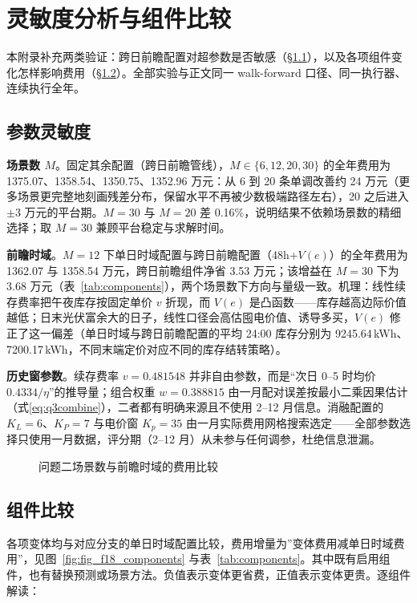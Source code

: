 \section{灵敏度分析与组件比较}\label{sec:sensitivity}
本附录补充两类验证：跨日前瞻配置对超参数是否敏感（\S\ref{sec:sens-param}），以及各项组件变化怎样影响费用（\S\ref{sec:ablation}）。全部实验与正文同一 walk-forward 口径、同一执行器、连续执行全年。

\subsection{参数灵敏度}\label{sec:sens-param}
\textbf{场景数 $M$}。固定其余配置（跨日前瞻管线），$M\in\{6,12,20,30\}$ 的全年费用为 1375.07、1358.54、1350.75、1352.96 万元：从 6 到 20 条单调改善约 24 万元（更多场景更完整地刻画残差分布，保留水平不再被少数极端路径左右），20 之后进入 $\pm3$ 万元的平台期。$M=30$ 与 $M=20$ 差 0.16\%，说明结果不依赖场景数的精细选择；取 $M=30$ 兼顾平台稳定与求解时间。

\textbf{前瞻时域}。$M=12$ 下单日时域配置与跨日前瞻配置（48h+$V(e)$）的全年费用为 1362.07 与 1358.54 万元，跨日前瞻组件净省 3.53 万元；该增益在 $M=30$ 下为 3.68 万元（表~\ref{tab:components}），两个场景数下方向与量级一致。机理：线性续存费率把午夜库存按固定单价 $v$ 折现，而 $V(e)$ 是凸函数——库存越高边际价值越低；日末光伏富余大的日子，线性口径会高估囤电价值、诱导多买，$V(e)$ 修正了这一偏差（单日时域与跨日前瞻配置的平均 24:00 库存分别为 9245.64\,kWh、7200.17\,kWh，不同末端定价对应不同的库存结转策略）。

\textbf{历史窗参数}。续存费率 $v=0.481548$ 并非自由参数，而是“次日 0--5 时均价 $0.4334/\eta$”的推导量；组合权重 $w=0.388815$ 由一月配对误差按最小二乘因果估计（式\eqref{eq:q3combine}），二者都有明确来源且不使用 2--12 月信息。消融配置的 $K_L=6$、$K_P=7$ 与电价窗 $K_p=35$ 由一月实际费用网格搜索选定——全部参数选择只使用一月数据，评分期（2--12 月）从未参与任何调参，杜绝信息泄漏。

\begin{figure}[!htbp]\centering
{}
\caption{问题二场景数与前瞻时域的费用比较}\label{fig:fig_f13_sensitivity}
\end{figure}

\subsection{组件比较}\label{sec:ablation}
各项变体均与对应分支的单日时域配置比较，费用增量为”变体费用减单日时域费用”，见图~\ref{fig:fig_f18_components} 与表~\ref{tab:components}。其中既有启用组件，也有替换预测或场景方法。负值表示变体更省费，正值表示变体更贵。逐组件解读：

